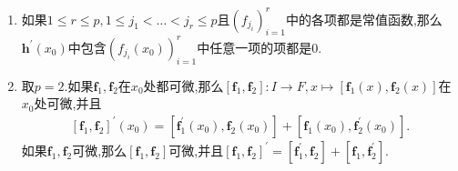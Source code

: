 \begin{remark}{}{}
	\begin{enumerate}
		\item 如果$1\leq r\leq p,1\leq j_{1}<\ldots<j_{r}\leq p$且$\left(f_{j_{i}}\right)_{i=1}^{r}$中的各项都是常值函数,那么$\mathbf{h}^{\prime}\left(x_{0}\right)$中包含$\left(f_{j_{i}}\left(x_{0}\right)\right)_{i=1}^{r}$中任意一项的项都是$0$.
		\item 取$p=2$.如果$\mathbf{f}_{1},\mathbf{f}_{2}$在$x_{0}$处都可微,那么$\left[\mathbf{f}_{1},\mathbf{f}_{2}\right]:I\to F,x\mapsto\left[\mathbf{f}_{1}\left(x\right),\mathbf{f}_{2}\left(x\right)\right]$在$x_{0}$处可微,并且
		\begin{align*}
			\left[\mathbf{f}_{1},\mathbf{f}_{2}\right]^{\prime}\left(x_{0}\right)=\left[\mathbf{f}_{1}^{\prime}\left(x_{0}\right),\mathbf{f}_{2}\left(x_{0}\right)\right]+\left[\mathbf{f}_{1}\left(x_{0}\right),\mathbf{f}_{2}^{\prime}\left(x_{0}\right)\right].
		\end{align*}
		如果$\mathbf{f}_{1},\mathbf{f}_{2}$可微,那么$\left[\mathbf{f}_{1},\mathbf{f}_{2}\right]$可微,并且$\left[\mathbf{f}_{1},\mathbf{f}_{2}\right]^{\prime}=\left[\mathbf{f}_{1}^{\prime},\mathbf{f}_{2}\right]+\left[\mathbf{f}_{1},\mathbf{f}_{2}^{\prime}\right]$.
	\end{enumerate}
\end{remark}


